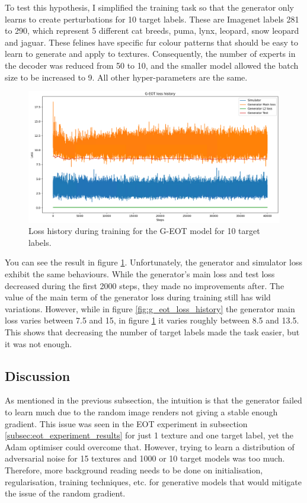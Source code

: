 To test this hypothesis, I simplified the training task so that the generator only learns to create perturbations for 10 target labels. These are Imagenet labels 281 to 290, which represent 5 different cat breeds, puma, lynx, leopard, snow leopard and jaguar. These felines have specific fur colour patterns that should be easy to learn to generate and apply to textures. Consequently, the number of experts in the decoder was reduced from 50 to 10, and the smaller model allowed the batch size to be increased to 9. All other hyper-parameters are the same.

\begin{figure}[ht]
    \centering
    \includegraphics[width=1\textwidth]{graphics/g_eot_loss_exp2.PNG}
    \caption{Loss history during training for the G-EOT model for 10 target labels.}
    \label{fig:g_eot_loss_exp2}
\end{figure}

You can see the result in figure \ref{fig:g_eot_loss_exp2}. Unfortunately, the generator and simulator loss exhibit the same behaviours. While the generator's main loss and test loss decreased during the first 2000 steps, they made no improvements after. The value of the main term of the generator loss during training still has wild variations. However, while in figure \ref{fig:g_eot_loss_history} the generator main loss varies between 7.5 and 15, in figure \ref{fig:g_eot_loss_exp2} it varies roughly between 8.5 and 13.5. This shows that decreasing the number of target labels made the task easier, but it was not enough.
    
\subsection{Discussion}

As mentioned in the previous subsection, the intuition is that the generator failed to learn much due to the random image renders not giving a stable enough gradient. This issue was seen in the EOT experiment in subsection \ref{subsec:eot_experiment_results} for just 1 texture and one target label, yet the Adam optimiser could overcome that. However, trying to learn a distribution of adversarial noise for 15 textures and 1000 or 10 target models was too much. Therefore, more background reading needs to be done on initialisation, regularisation, training techniques, etc. for generative models that would mitigate the issue of the random gradient.

